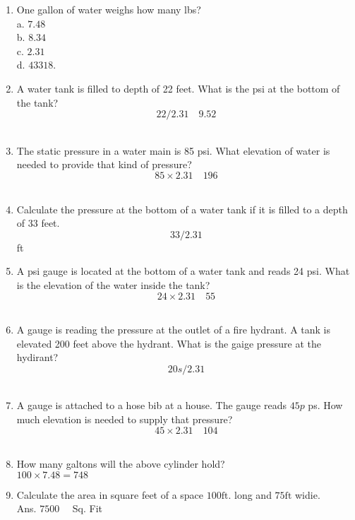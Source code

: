 \documentclass{article}
\begin{document}
\begin{enumerate}
\item One gallon of water weighs how many lbs?\\
a. $7.48$\\
b. $8.34$\\
c. $2.31$\\
d. $433 18$.

\item A water tank is filled to depth of 22 feet. What is the psi at the bottom of the tank?\\
$$22 / 2.31 \quad 9.52$$\\

\item The static pressure in a water main is 85 psi. What elevation of water is needed to provide that kind of pressure?\\
$$85 \times 2.31 \quad 196$$\\

\item Calculate the pressure at the bottom of a water tank if it is filled to a depth of 33 feet.\\
$$33 / 2.31$$ft\\

\item A psi gauge is located at the bottom of a water tank and reads 24 psi. What is the elevation of the water inside the tank?\\
$$24 \times 2.31 \quad 55$$\\

\item A gauge is reading the pressure at the outlet of a fire hydrant. A tank is elevated 200 feet above the hydrant. What is the gaige pressure at the hydirant?\\
$$20 s / 2.31$$\\

\item A gauge is attached to a hose bib at a house. The gauge reads $45 p$ ps. How much elevation is needed to supply that pressure?\\
$$45 \times 2.31 \quad 104$$\\

\item How many galtons will the above cylinder hold?\\
$100 \times 7.48=748$\\

\item Calculate the area in square feet of a space $100 \mathrm{ft}$. long and $75 \mathrm{ft}$ widie.\\
Ans. $7500 \quad$ Sq. Fit\\


\end{enumerate}
\end{document}
